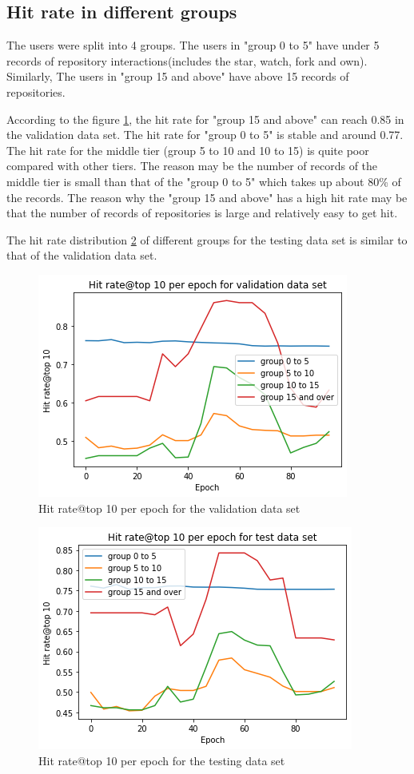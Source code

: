 \documentclass[11pt,twoside]{report}
\begin{document}
\subsection{Hit rate in different groups}
The users were split into 4 groups. The users in "group 0 to 5" have under 5 records of repository interactions(includes the star, watch, fork and own). Similarly, The users in "group 15 and above" have above 15 records of repositories.

According to the figure \ref{fig:hitrate_10_valid}, the hit rate for "group 15 and above" can reach 0.85 in the validation data set. The hit rate for "group 0 to 5" is stable and around 0.77. The hit rate for the middle tier (group 5 to 10 and 10 to 15) is quite poor compared with other tiers. The reason may be the number of records of the middle tier is small than that of the "group 0 to 5" which takes up about 80\% of the records. The reason why the "group 15 and above" has a high hit rate may be that the number of records of repositories is large and relatively easy to get hit.

The hit rate distribution \ref{fig:hitrate_10_test} of different groups for the testing data set is similar to that of the validation data set.

\begin{figure}[H]
    \centering
    \includegraphics[scale=0.9]{hitrate@10_valid.png}
    \caption{Hit rate@top 10 per epoch for the validation data set}
    \label{fig:hitrate_10_valid}
\end{figure}

\begin{figure}[H]
    \centering
    \includegraphics[scale=0.9]{hitrate@10_test.png}
    \caption{Hit rate@top 10 per epoch for the testing data set}
    \label{fig:hitrate_10_test}
\end{figure}
\end{document}
